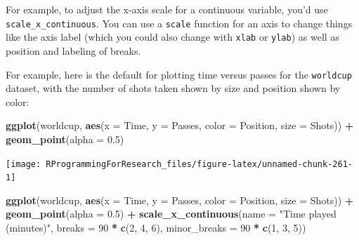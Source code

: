 \documentclass[]{book}
\makeatletter
\newenvironment{Shaded}{\begin{snugshade}}{\end{snugshade}}
\newcommand{\KeywordTok}[1]{\textcolor[rgb]{0.13,0.29,0.53}{\textbf{#1}}}
\newcommand{\DataTypeTok}[1]{\textcolor[rgb]{0.13,0.29,0.53}{#1}}
\newcommand{\DecValTok}[1]{\textcolor[rgb]{0.00,0.00,0.81}{#1}}
\newcommand{\FloatTok}[1]{\textcolor[rgb]{0.00,0.00,0.81}{#1}}
\newcommand{\StringTok}[1]{\textcolor[rgb]{0.31,0.60,0.02}{#1}}
\newcommand{\OperatorTok}[1]{\textcolor[rgb]{0.81,0.36,0.00}{\textbf{#1}}}
\newcommand{\NormalTok}[1]{#1}
\newenvironment{kframe}{%
\medskip{}
\setlength{\fboxsep}{.8em}
 \def\at@end@of@kframe{}%
 \ifinner\ifhmode%
  \def\at@end@of@kframe{\end{minipage}}%
  \begin{minipage}{\columnwidth}%
 \fi\fi%
 \def\FrameCommand##1{\hskip\@totalleftmargin \hskip-\fboxsep
 \colorbox{shadecolor}{##1}\hskip-\fboxsep
     \hskip-\linewidth \hskip-\@totalleftmargin \hskip\columnwidth}%
 \MakeFramed {\advance\hsize-\width
   \@totalleftmargin\z@ \linewidth\hsize
   \@setminipage}}%
 {\par\unskip\endMakeFramed%
 \at@end@of@kframe}
\renewenvironment{Shaded}{\begin{kframe}}{\end{kframe}}
\theoremstyle{definition}
\theoremstyle{definition}
\theoremstyle{definition}
\theoremstyle{remark}
\makeatother
\begin{document}
For example, to adjust the x-axis scale for a continuous variable, you'd
use \texttt{scale\_x\_continuous}. You can use a \texttt{scale} function
for an axis to change things like the axis label (which you could also
change with \texttt{xlab} or \texttt{ylab}) as well as position and
labeling of breaks.

For example, here is the default for plotting time versus passes for the
\texttt{worldcup} dataset, with the number of shots taken shown by size
and position shown by color:

\begin{Shaded}
\begin{Highlighting}[]
\KeywordTok{ggplot}\NormalTok{(worldcup, }\KeywordTok{aes}\NormalTok{(}\DataTypeTok{x =}\NormalTok{ Time, }\DataTypeTok{y =}\NormalTok{ Passes,}
                     \DataTypeTok{color =}\NormalTok{ Position, }\DataTypeTok{size =}\NormalTok{ Shots)) }\OperatorTok{+}\StringTok{ }
\StringTok{  }\KeywordTok{geom_point}\NormalTok{(}\DataTypeTok{alpha =} \FloatTok{0.5}\NormalTok{)}
\end{Highlighting}
\end{Shaded}

\begin{center}\texttt{[image: RProgrammingForResearch\_files/figure-latex/unnamed-chunk-261-1]} \end{center}

\begin{Shaded}
\begin{Highlighting}[]
\KeywordTok{ggplot}\NormalTok{(worldcup, }\KeywordTok{aes}\NormalTok{(}\DataTypeTok{x =}\NormalTok{ Time, }\DataTypeTok{y =}\NormalTok{ Passes,}
                     \DataTypeTok{color =}\NormalTok{ Position, }\DataTypeTok{size =}\NormalTok{ Shots)) }\OperatorTok{+}\StringTok{ }
\StringTok{  }\KeywordTok{geom_point}\NormalTok{(}\DataTypeTok{alpha =} \FloatTok{0.5}\NormalTok{) }\OperatorTok{+}\StringTok{ }
\StringTok{  }\KeywordTok{scale_x_continuous}\NormalTok{(}\DataTypeTok{name =} \StringTok{"Time played (minutes)"}\NormalTok{, }
                     \DataTypeTok{breaks =} \DecValTok{90} \OperatorTok{*}\StringTok{ }\KeywordTok{c}\NormalTok{(}\DecValTok{2}\NormalTok{, }\DecValTok{4}\NormalTok{, }\DecValTok{6}\NormalTok{),}
                     \DataTypeTok{minor_breaks =} \DecValTok{90} \OperatorTok{*}\StringTok{ }\KeywordTok{c}\NormalTok{(}\DecValTok{1}\NormalTok{, }\DecValTok{3}\NormalTok{, }\DecValTok{5}\NormalTok{))}
\end{Highlighting}
\end{Shaded}
\end{document}
